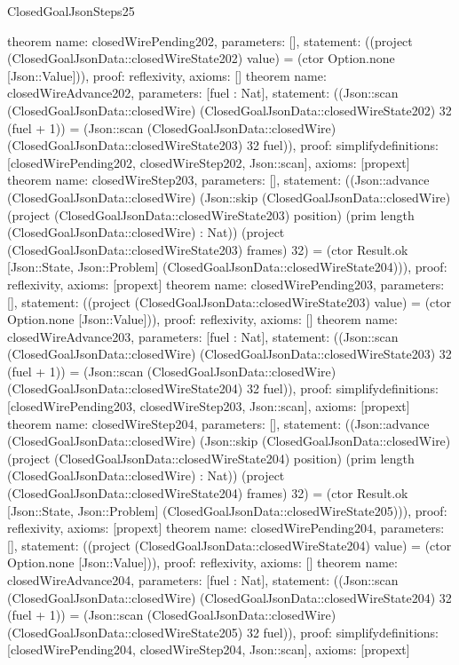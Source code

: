 \begin{lexlean}{ClosedGoalJsonSteps25}
\begin{semanticmodule}
{}
theorem{
 name: closedWirePending202, parameters: [],
 statement: ((project (ClosedGoalJsonData::closedWireState202) value) = (ctor Option.none [Json::Value])), proof: reflexivity{}, axioms: []
}
theorem{
 name: closedWireAdvance202, parameters: [fuel : Nat],
 statement: ((Json::scan (ClosedGoalJsonData::closedWire) (ClosedGoalJsonData::closedWireState202) 32 (fuel + 1)) = (Json::scan (ClosedGoalJsonData::closedWire) (ClosedGoalJsonData::closedWireState203) 32 fuel)), proof: simplify{definitions: [closedWirePending202, closedWireStep202, Json::scan]}, axioms: [propext]
}
theorem{
 name: closedWireStep203, parameters: [],
 statement: ((Json::advance (ClosedGoalJsonData::closedWire) (Json::skip (ClosedGoalJsonData::closedWire) (project (ClosedGoalJsonData::closedWireState203) position) (prim length (ClosedGoalJsonData::closedWire) : Nat)) (project (ClosedGoalJsonData::closedWireState203) frames) 32) = (ctor Result.ok [Json::State, Json::Problem] (ClosedGoalJsonData::closedWireState204))), proof: reflexivity{}, axioms: [propext]
}
theorem{
 name: closedWirePending203, parameters: [],
 statement: ((project (ClosedGoalJsonData::closedWireState203) value) = (ctor Option.none [Json::Value])), proof: reflexivity{}, axioms: []
}
theorem{
 name: closedWireAdvance203, parameters: [fuel : Nat],
 statement: ((Json::scan (ClosedGoalJsonData::closedWire) (ClosedGoalJsonData::closedWireState203) 32 (fuel + 1)) = (Json::scan (ClosedGoalJsonData::closedWire) (ClosedGoalJsonData::closedWireState204) 32 fuel)), proof: simplify{definitions: [closedWirePending203, closedWireStep203, Json::scan]}, axioms: [propext]
}
theorem{
 name: closedWireStep204, parameters: [],
 statement: ((Json::advance (ClosedGoalJsonData::closedWire) (Json::skip (ClosedGoalJsonData::closedWire) (project (ClosedGoalJsonData::closedWireState204) position) (prim length (ClosedGoalJsonData::closedWire) : Nat)) (project (ClosedGoalJsonData::closedWireState204) frames) 32) = (ctor Result.ok [Json::State, Json::Problem] (ClosedGoalJsonData::closedWireState205))), proof: reflexivity{}, axioms: [propext]
}
theorem{
 name: closedWirePending204, parameters: [],
 statement: ((project (ClosedGoalJsonData::closedWireState204) value) = (ctor Option.none [Json::Value])), proof: reflexivity{}, axioms: []
}
theorem{
 name: closedWireAdvance204, parameters: [fuel : Nat],
 statement: ((Json::scan (ClosedGoalJsonData::closedWire) (ClosedGoalJsonData::closedWireState204) 32 (fuel + 1)) = (Json::scan (ClosedGoalJsonData::closedWire) (ClosedGoalJsonData::closedWireState205) 32 fuel)), proof: simplify{definitions: [closedWirePending204, closedWireStep204, Json::scan]}, axioms: [propext]
}
\end{semanticmodule}
\end{lexlean}
